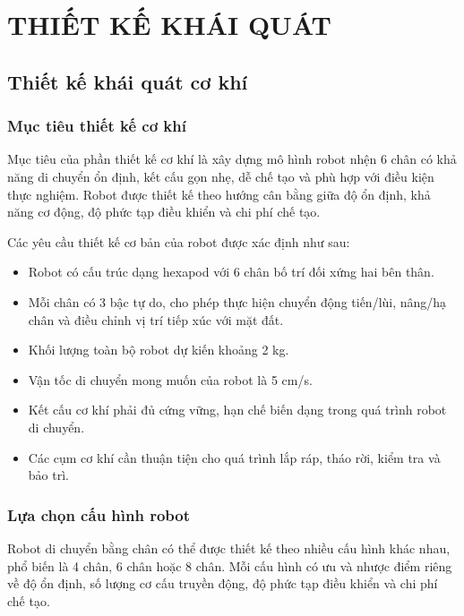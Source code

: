 \chapter{THIẾT KẾ KHÁI QUÁT}
    \section{Thiết kế khái quát cơ khí}

        \subsection{Mục tiêu thiết kế cơ khí}

            \hspace{0.5cm} Mục tiêu của phần thiết kế cơ khí là xây dựng mô hình robot nhện 6 chân có khả năng di chuyển ổn định, kết cấu gọn nhẹ, dễ chế tạo và phù hợp với điều kiện thực nghiệm. Robot được thiết kế theo hướng cân bằng giữa độ ổn định, khả năng cơ động, độ phức tạp điều khiển và chi phí chế tạo.

            \hspace{0.5cm} Các yêu cầu thiết kế cơ bản của robot được xác định như sau:

            \begin{itemize}
                \item Robot có cấu trúc dạng hexapod với 6 chân bố trí đối xứng hai bên thân.
                \item Mỗi chân có 3 bậc tự do, cho phép thực hiện chuyển động tiến/lùi, nâng/hạ chân và điều chỉnh vị trí tiếp xúc với mặt đất.
                \item Khối lượng toàn bộ robot dự kiến khoảng 2 kg.
                \item Vận tốc di chuyển mong muốn của robot là 5 cm/s.
                \item Kết cấu cơ khí phải đủ cứng vững, hạn chế biến dạng trong quá trình robot di chuyển.
                \item Các cụm cơ khí cần thuận tiện cho quá trình lắp ráp, tháo rời, kiểm tra và bảo trì.
            \end{itemize}

        \subsection{Lựa chọn cấu hình robot}

            \hspace{0.5cm} Robot di chuyển bằng chân có thể được thiết kế theo nhiều cấu hình khác nhau, phổ biến là 4 chân, 6 chân hoặc 8 chân. Mỗi cấu hình có ưu và nhược điểm riêng về độ ổn định, số lượng cơ cấu truyền động, độ phức tạp điều khiển và chi phí chế tạo.

